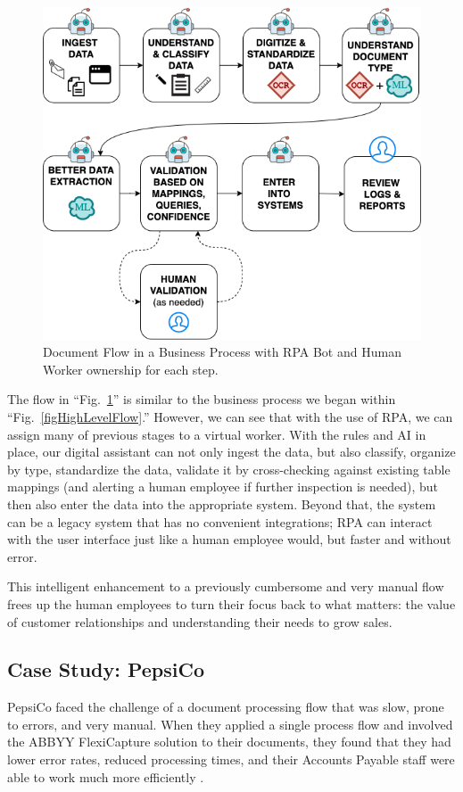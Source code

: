 \documentclass[conference, draftcls]{IEEEtran}
\begin{document}
\begin{figure}[ht]
\centerline{\includegraphics[width=\columnwidth]{BotFlow.png}}
\caption{Document Flow in a Business Process with RPA Bot and Human Worker ownership for each step.}
\label{figBotFlow}
\end{figure}

The flow in ``Fig.~\ref{figBotFlow}'' is similar to the business process we began within ``Fig.~\ref{figHighLevelFlow}.'' However, we can see that with the use of RPA, we can assign many of previous stages to a virtual worker. With the rules and AI in place, our digital assistant can not only ingest the data, but also classify, organize by type, standardize the data, validate it by cross-checking against existing table mappings (and alerting a human employee if further inspection is needed), but then also enter the data into the appropriate system. Beyond that, the system can be a legacy system that has no convenient integrations; RPA can interact with the user interface just like a human employee would, but faster and without error.

This intelligent enhancement to a previously cumbersome and very manual flow frees up the human employees to turn their focus back to what matters: the value of customer relationships and understanding their needs to grow sales.

\subsection{Case Study: PepsiCo}
PepsiCo faced the challenge of a document processing flow that was slow, prone to errors, and very manual. When they applied a single process flow and involved the ABBYY FlexiCapture solution to their documents, they found that they had lower error rates, reduced processing times, and their Accounts Payable staff were able to work much more efficiently \cite{pepsico}.
\end{document}
